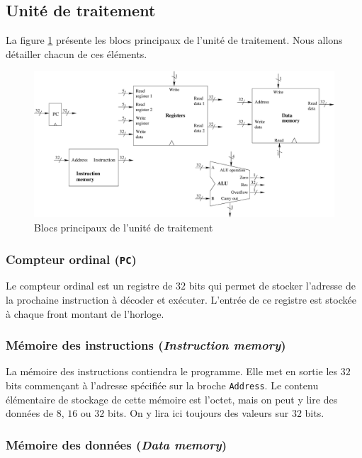 \documentclass[12pt]{article}
\begin{document}
\subsection{Unité de traitement}

La figure \ref{fig:traitement1} présente les blocs principaux de l'unité de traitement. Nous allons détailler chacun de ces éléments.

\begin{figure}[!htpb]
\begin{center}
\includegraphics[width=16cm]{traitement1.eps}
\caption{Blocs principaux de l'unité de traitement}
\label{fig:traitement1}
\end{center}
\end{figure}


\subsubsection{Compteur ordinal (\texttt{PC})}

Le compteur ordinal est un registre de $32$ bits qui permet de stocker l'adresse
de la prochaine instruction à décoder et exécuter. L'entrée de ce registre est stockée à chaque
front montant de l'horloge.

\subsubsection{Mémoire des instructions (\emph{Instruction memory})}

La mémoire des instructions contiendra le programme. Elle met en sortie les $32$ bits commençant
à l'adresse spécifiée sur la broche \verb+Address+. Le contenu élémentaire de stockage de cette mémoire est l'octet,
mais on peut y lire des données de $8$, $16$ ou $32$ bits. On y lira ici toujours des valeurs sur $32$ bits.

\subsubsection{Mémoire des données (\emph{Data memory})}
\end{document}
